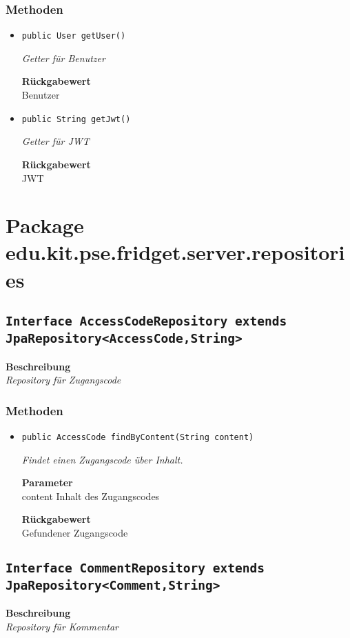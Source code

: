    \subsubsection*{Methoden}
    \begin{itemize}
    	\item{\texttt{public User getUser()}}
    	
    	\textit{Getter für Benutzer}
    	
    	
    	
    	\textbf{Rückgabewert} \\
    	Benutzer        \item{\texttt{public String getJwt()}}
    	
    	\textit{Getter für JWT}
    	
    	
    	
    	\textbf{Rückgabewert} \\
    	JWT
    \end{itemize}
    \section{Package edu.kit.pse.fridget.server.repositories}
    \subsection{\texttt{Interface AccessCodeRepository extends JpaRepository<AccessCode,String>}}
    \textbf{Beschreibung} \\
    \textit{Repository für Zugangscode}
    \subsubsection*{Methoden}
    \begin{itemize}
    	\item{\texttt{public AccessCode findByContent(String content)}}
    	
    	\textit{Findet einen Zugangscode über Inhalt.}
    	
    	\textbf{Parameter} \\
    	content Inhalt des Zugangscodes
    	
    	\textbf{Rückgabewert} \\
    	Gefundener Zugangscode
    \end{itemize}
    \subsection{\texttt{Interface CommentRepository extends JpaRepository<Comment,String>}}
    \textbf{Beschreibung} \\
    \textit{Repository für Kommentar}
